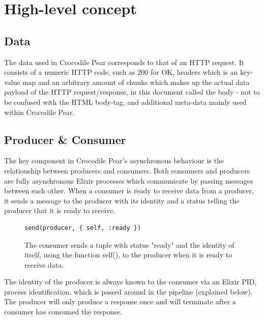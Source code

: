 \documentclass{cslthse-msc}
\begin{document}
\section{High-level concept}

\subsection{Data}
The data used in Crocodile Pear corresponds to that of an HTTP request. It consists of a numeric HTTP code, such as 200 for OK, headers which is an key-value map and an arbitrary amount of chunks which makes up the actual data payload of the HTTP request/response, in this document called the body - not to be confused with the HTML body-tag, and additional meta-data mainly used within Crocodile Pear.

\subsection{Producer \& Consumer}
The key component in Crocodile Pear's asynchronous behaviour is the relationship between producers and consumers. Both consumers and producers are fully asynchronous Elixir processes which communicate by passing messages between each other. When a consumer is ready to receive data from a producer, it sends a message to the producer with its identity and a status telling the producer that it is ready to receive.

\begin{figure}[H]
  \centering
\begin{lstlisting}[breaklines=true,frame=single]
send(producer, { self, :ready })	
\end{lstlisting}
  \caption{The consumer sends a tuple with status "ready" and the identity of itself, using the function self(), to the producer when it is ready to receive data.}
\end{figure}

The identity of the producer is always known to the consumer via an Elixir PID, process identification, which is passed around in the pipeline (explained below). The producer will only produce a response once and will terminate after a consumer has consumed the response.
\end{document}
